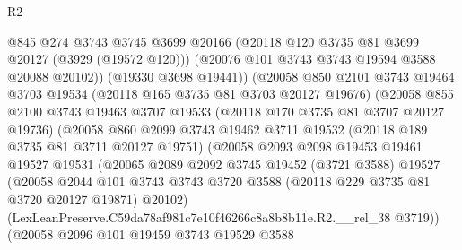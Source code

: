\begin{lexlean}{R2}
\begin{coremodule}
                          @845
                          @274
                          @3743
                          @3745
                          @3699
                          @20166
                          (@20118 @120 @3735 @81 @3699 @20127 (@3929 (@19572 @120)))
                          (@20076 @101 @3743 @3743 @19594 @3588 @20088 @20102))
                        (@19330 @3698 @19441))
                      (@20058
                        @850
                        @2101
                        @3743
                        @19464
                        @3703
                        @19534
                        (@20118 @165 @3735 @81 @3703 @20127 @19676)
                        (@20058
                          @855
                          @2100
                          @3743
                          @19463
                          @3707
                          @19533
                          (@20118 @170 @3735 @81 @3707 @20127 @19736)
                          (@20058
                            @860
                            @2099
                            @3743
                            @19462
                            @3711
                            @19532
                            (@20118 @189 @3735 @81 @3711 @20127 @19751)
                            (@20058
                              @2093
                              @2098
                              @19453
                              @19461
                              @19527
                              @19531
                              (@20065
                                @2089
                                @2092
                                @3745
                                @19452
                                (@3721 @3588)
                                @19527
                                (@20058
                                  @2044
                                  @101
                                  @3743
                                  @3743
                                  @3720
                                  @3588
                                  (@20118 @229 @3735 @81 @3720 @20127 @19871)
                                  @20102)
                                (LexLeanPreserve.C59da78af981c7e10f46266c8a8b8b11e.R2.__rel_38
                                  @3719))
                              (@20058
                                @2096
                                @101
                                @19459
                                @3743
                                @19529
                                @3588

\end{coremodule}
\end{lexlean}
